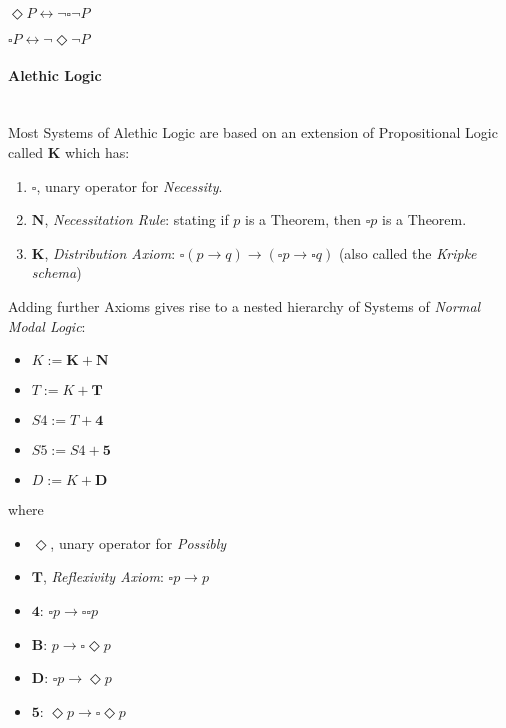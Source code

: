 \documentclass{article}
\begin{document}
    $\Diamond P \leftrightarrow \neg \square \neg P$

    $\square P \leftrightarrow \neg \Diamond \neg P$

\paragraph{Alethic Logic} \hfill \\

Most Systems of Alethic Logic are based on an extension of
Propositional Logic called $\mathbf{K}$ which has:

\begin{enumerate}
\item $\square$, unary operator for \emph{Necessity}.
\item $\mathbf{N}$, \emph{Necessitation Rule}: stating if $p$ is a
  Theorem, then $\square p$ is a Theorem.
\item $\mathbf{K}$, \emph{Distribution Axiom}: $\square(p \rightarrow
  q) \rightarrow (\square p \rightarrow \square q)$ (also called the
  \emph{Kripke schema})
\end{enumerate}

Adding further Axioms gives rise to a nested hierarchy of Systems of
\emph{Normal Modal Logic}:

\begin{itemize}
\item $K := \mathbf{K} + \mathbf{N}$
\item $T := K + \mathbf{T}$
\item $S4 := T + \mathbf{4}$
\item $S5 := S4 + \mathbf{5}$
\item $D := K + \mathbf{D}$
\end{itemize}

where

\begin{itemize}
\item $\Diamond$, unary operator for \emph{Possibly}
\item $\mathbf{T}$, \emph{Reflexivity Axiom}: $\square p \rightarrow p$
\item $\mathbf{4}$: $\square p \rightarrow \square \square p$
\item $\mathbf{B}$: $p \rightarrow \square \Diamond p$
\item $\mathbf{D}$: $\square p \rightarrow \Diamond p$
\item $\mathbf{5}$: $\Diamond p \rightarrow \square \Diamond p$
\end{itemize}
\end{document}
